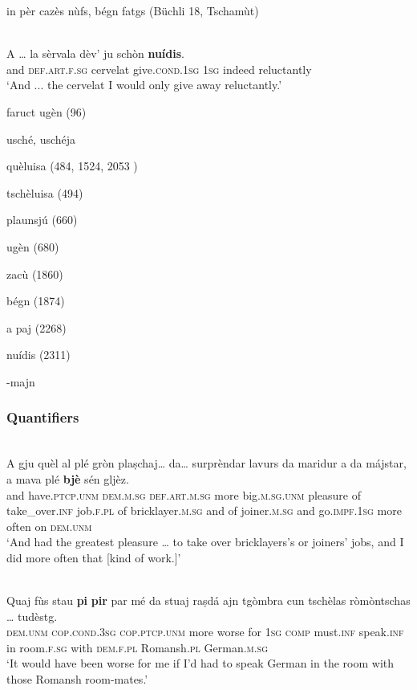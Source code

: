 in pèr cazès nùfs, bégn fatgs (Büchli 18, Tschamùt)


\ea
\label{}
\\
	\gll A … la sèrvala dèv’ ju schòn \textbf{nuídis}.    \\
and {} \textsc{def.art.f.sg} cervelat give.\textsc{cond.1sg} \textsc{1sg} indeed reluctantly\\
\glt `And ... the cervelat I would only give away reluctantly.'
\z

faruct ugèn (96)

usché, uschéja

quèluisa (484, 1524, 2053 )

tschèluisa (494)

plaunsjú (660)

ugèn (680)

zacù (1860)

bégn (1874)

a paj (2268)

nuídis (2311)

{\color{red}-majn}



\subsubsection{Quantifiers}

\ea\label{}
\\
\gll    A gju quèl al plé gròn plaṣchaj… da… surprèndar lavurs da maridur a da májstar, a mava plé \textbf{bjè} sén gljèz.\\
and have.\textsc{ptcp.unm} \textsc{dem.m.sg} \textsc{def.art.m.sg} more big.\textsc{m.sg.unm} pleasure of  take\_over.\textsc{inf} job.\textsc{f.pl} of bricklayer.\textsc{m.sg} and of joiner.\textsc{m.sg} and  go.\textsc{impf.1sg} more often on \textsc{dem.unm}\\
\glt `And had the greatest pleasure … to take over bricklayers’s or joiners’ jobs, and I did more often that [kind of work.]'
\z

\ea
\label{}
\\
\gll    Quaj fùs stau \textbf{pi} \textbf{pir} par mé da stuaj raṣdá ajn tgòmbra cun tschèlas ròmòntschas … tudèstg.\\
\textsc{dem.unm} \textsc{cop.cond.3sg} \textsc{cop.ptcp.unm} more worse for \textsc{1sg} \textsc{comp} must.\textsc{inf} speak.\textsc{inf} in room.\textsc{f.sg} with \textsc{dem.f.pl} Romansh.\textsc{pl} {} German.\textsc{m.sg}\\
\glt `It would have been worse for me if I'd had to speak German in the room with those Romansh room-mates.'
\z

